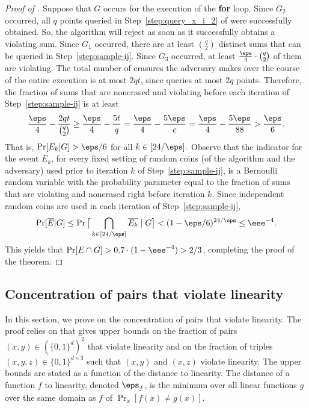 \documentclass{toc}
\begin{document}
\begin{proof}[Proof of ]
Suppose that $G$ occurs for the execution of the \textbf{for} loop. Since $G_2$ occurred, all $q$ points queried in Step~\ref{step:query_x_i_2} of  were successfully obtained. So, the algorithm will reject as soon as it successfully obtains a violating sum. Since $G_1$ occurred, there are at least $\binom{q}{2}$ distinct sums that can be queried in Step~\ref{step:sample-ij}. Since $G_3$ occurred, at least $\frac \eps 4\cdot \binom{q}{2}$ of them are violating.
%
The total number of erasures the adversary makes over the course of the entire execution is at most $2qt$, since  queries at most $2q$ points.
Therefore, the fraction of sums that are nonerased and violating before each iteration of Step~\ref{step:sample-ij} is at least
\begin{align*}
\frac \eps 4 -\frac {2qt}{\binom q 2}
\geq\frac \eps 4 -\frac {5t}{q}
=\frac \eps 4 -\frac {5\eps}{c}
=\frac \eps 4 -\frac {5\eps}{88}
> \frac \eps 6. 
\end{align*}
That is, $\Pr[E_k|G]> \eps/6$ for all $k\in[24/\eps].$
Observe that the indicator for the event $E_k$, for every fixed setting of random coins (of the algorithm and the adversary) used prior to iteration $k$ of Step~\ref{step:sample-ij}, 
is a Bernoulli random variable with the probability parameter equal to the fraction of sums that are violating and nonerased right before iteration $k$. %
Since independent random coins are used in each iteration of Step~\ref{step:sample-ij},
%
\begin{align*}
   \Pr[\overline{E}|G]
\leq \Pr\big[\bigcap_{k\in[24/\eps]}\overline{E_k}\mid G\big]
%
< (1-\eps/6)^{24/\eps}
\leq \eee^{-4}. 
\end{align*}
This yields that $\Pr[E\cap G]>0.7\cdot(1-\eee^{-4})> 2/3$, completing the proof of the theorem.
\end{proof}


\subsection{Concentration of pairs that violate linearity}\label{sec:violating_sums}

In this section, we prove  on the concentration of pairs that violate linearity. %
The proof relies on   that gives upper bounds on the fraction of pairs $(x,y) \in (\{0,1\}^d)^2$ that violate linearity and on the fraction of triples $(x, y, z) \in \{0,1\}^{d\times 3}$ such that $(x,y)$ and $(x,z)$ violate linearity. The upper bounds are stated as a function of the distance to linearity.
%
%
%
The distance of a function $f$ to linearity, denoted $\eps_f$, is the minimum over all linear functions $g$ over the same domain as $f$ of 
$\Pr_x[f(x)\neq g(x)]$.
%
\end{document}
